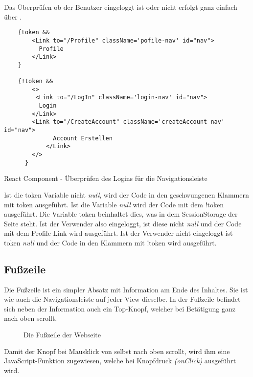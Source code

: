 \pagebreak

Das Überprüfen ob der Benutzer eingeloggt ist oder nicht erfolgt ganz einfach über \underline{}.


\begin{code}[htp]
\begin{lstlisting}
    {token && 
        <Link to="/Profile" className='pofile-nav' id="nav">
          Profile
        </Link>
    }

    {!token &&
        <>
         <Link to="/LogIn" className='login-nav' id="nav">
          Login
        </Link>
        <Link to="/CreateAccount" className='createAccount-nav' id="nav">
              Account Erstellen
            </Link>
        </>
      }
\end{lstlisting}
\caption{React Component - Überprüfen des Logins für die Navigationsleiste}
\end{code}

Ist die token Variable nicht \textit{null}, wird der Code in den geschwungenen Klammern 
mit token ausgeführt. Ist die Variable \textit{null} wird der Code mit dem !token ausgeführt. 
Die Variable token beinhaltet dies, was in dem SessionStorage der Seite steht. Ist der Verwender also eingeloggt, ist diese 
nicht \textit{null} und der Code mit dem Profile-Link wird ausgeführt. Ist der Verwender nicht eingeloggt ist token 
\textit{null} und der Code in den Klammern mit !token wird ausgeführt.

\subsection{Fußzeile}
\label{footer}

Die Fußzeile ist ein simpler Absatz mit Information am Ende des Inhaltes.
Sie ist wie auch die Navigationsleiste auf jeder View dieselbe. In der Fußzeile befindet sich neben 
der Information auch ein Top-Knopf, welcher bei Betätigung ganz nach oben scrollt. 

\begin{figure}[H]
    \begin{center}
      \caption{Die Fußzeile der Webseite}
    \end{center}
\end{figure}

\pagebreak

Damit der Knopf bei Mausklick von selbst nach oben scrollt, wird ihm eine JavaScript-Funktion 
zugewiesen, welche bei Knopfdruck \textit{(onClick)} ausgeführt wird.

